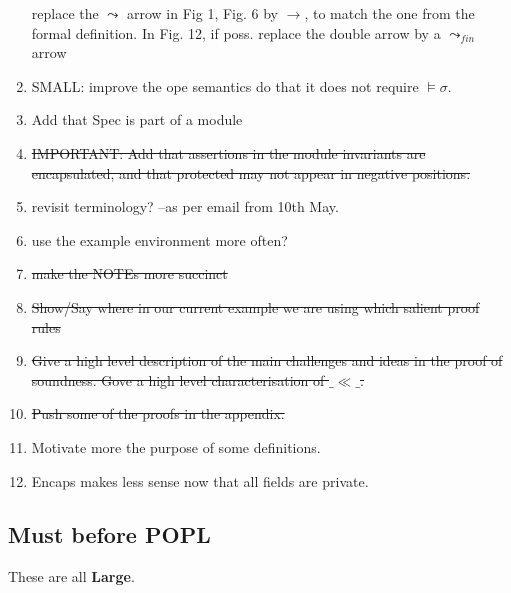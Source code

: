 \documentclass[acmsmall,review,anonymous]{acmart}\settopmatter{printfolios=true}
\begin{document}
\begin{enumerate}
replace the $\leadsto$ arrow in Fig 1, Fig. 6 by $\rightarrow$, to match the one from the formal definition. In Fig. 12, if poss. replace the double arrow by a $\leadsto_{fin}$ arrow 

\item
SMALL: improve the ope semantics do that it does not require $\models \sigma$.
\item
Add that Spec is part of a module

\item
\st{IMPORTANT: Add that assertions in the module invariants are encapsulated, and that protected may not appear in negative positions.}

\item
revisit terminology? --as per email from 10th May.

\item
use the example environment more often?

\item
\st{make the NOTEs more succinct}

\item
\st{Show/Say where in our current example we are using which salient proof rules}

\item
\st{Give a high level description of the main challenges and ideas in the proof of soundness. Gove a high level characterisation of $\_\ll\_$.}

\item
\st{Push some of the proofs in the appendix.}

\item
Motivate more the purpose of some definitions.

\item
Encaps makes less sense now that all fields are private. 

\end{enumerate}


 \subsection{Must before POPL}

These are all \textbf{Large}.
\end{document}
